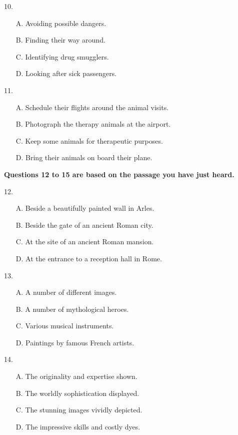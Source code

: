 \documentclass[UTF8,11pt]{ctexart}
\begin{document}
10.


\begin{itemize}[leftmargin=2em,itemsep=.2em,topsep=.4em]\item[A.] Avoiding possible dangers.
\item[B.] Finding their way around.
\item[C.] Identifying drug smugglers.
\item[D.] Looking after sick passengers.
\end{itemize}

11.


\begin{itemize}[leftmargin=2em,itemsep=.2em,topsep=.4em]\item[A.] Schedule their flights around the animal visits.
\item[B.] Photograph the therapy animals at the airport.
\item[C.] Keep some animals for therapeutic purposes.
\item[D.] Bring their animals on board their plane.
\end{itemize}

\textbf{Questions 12 to 15 are based on the passage you have just heard.}


12.


\begin{itemize}[leftmargin=2em,itemsep=.2em,topsep=.4em]\item[A.] Beside a beautifully painted wall in Arles.
\item[B.] Beside the gate of an ancient Roman city.
\item[C.] At the site of an ancient Roman mansion.
\item[D.] At the entrance to a reception hall in Rome.
\end{itemize}

13.


\begin{itemize}[leftmargin=2em,itemsep=.2em,topsep=.4em]\item[A.] A number of different images.
\item[B.] A number of mythological heroes.
\item[C.] Various musical instruments.
\item[D.] Paintings by famous French artists.
\end{itemize}

14.


\begin{itemize}[leftmargin=2em,itemsep=.2em,topsep=.4em]\item[A.] The originality and expertise shown.
\item[B.] The worldly sophistication displayed.
\item[C.] The stunning images vividly depicted.
\item[D.] The impressive skills and costly dyes.
\end{itemize}
\end{document}
